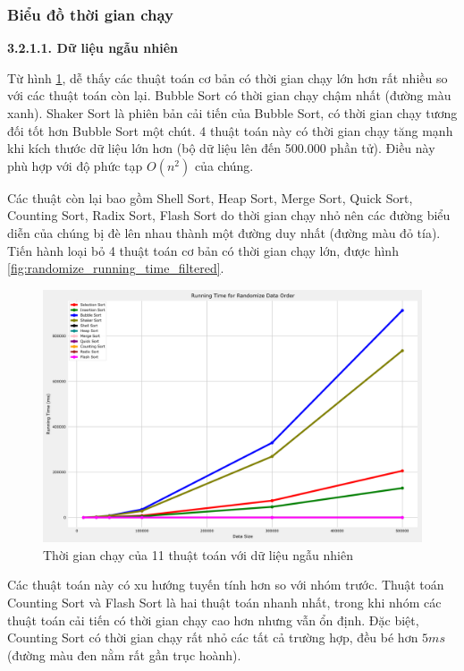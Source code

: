 \subsubsection{Biểu đồ thời gian chạy}

\textbf{3.2.1.1. Dữ liệu ngẫu nhiên}

Từ hình \ref{fig:randomize_running_time}, dễ thấy các thuật toán cơ bản có thời gian chạy lớn hơn rất nhiều so với các thuật toán còn lại. Bubble Sort có thời gian chạy chậm nhất (đường màu xanh). Shaker Sort là phiên bản cải tiến của Bubble Sort, có thời gian chạy tương đối tốt hơn Bubble Sort một chút. 4 thuật toán này có thời gian chạy tăng mạnh khi kích thước dữ liệu lớn hơn (bộ dữ liệu lên đến 500.000 phần tử). Điều này phù hợp với độ phức tạp $O(n^2)$ của chúng.


Các thuật còn lại bao gồm Shell Sort, Heap Sort, Merge Sort, Quick Sort, Counting Sort, Radix Sort, Flash Sort do thời gian chạy nhỏ nên các đường biểu diễn của chúng bị đè lên nhau thành một đường duy nhất (đường màu đỏ tía). Tiến hành loại bỏ 4 thuật toán cơ bản có thời gian chạy lớn, được hình \ref{fig:randomize_running_time_filtered}.

\begin{figure}[H]
    \centering
    \includegraphics[width=\textwidth]{experimental_result/images/randomize_running_time.png}
    \caption{Thời gian chạy của 11 thuật toán với dữ liệu ngẫu nhiên}
    \label{fig:randomize_running_time}
\end{figure}

Các thuật toán này có xu hướng tuyến tính hơn so với nhóm trước. Thuật toán Counting Sort và Flash Sort là hai thuật toán nhanh nhất, trong khi nhóm các thuật toán cải tiến có thời gian chạy cao hơn nhưng vẫn ổn định. Đặc biệt, Counting Sort có thời gian chạy rất nhỏ các tất cả trường hợp, đều bé hơn $5 ms$ (đường màu đen nằm rất gần trục hoành).

